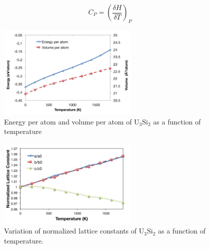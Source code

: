 \documentclass[review]{elsarticle}
\begin{document}
\begin{equation}
\label{eq:cp}
C_{P} = \left(\frac{\delta H}{\delta T}\right)_{P}
\end{equation}

 \begin{figure}[hbt]
	\centering
	\includegraphics[width=0.6\textwidth]{u3si2tempA.png}
    \caption{Energy per atom and volume per atom of U$_{3}$Si$_{2}$ as a function of temperature}\label{fig:ben5}
\end{figure}

\begin{figure}[hbt]
	\centering
	\includegraphics[width=0.6\textwidth]{latticetemp.jpg}
    \caption{Variation of normalized lattice constants of U$_{3}$Si$_{2}$ as a function of temperature.}\label{fig:latticetemp}
\end{figure}

\FloatBarrier
\end{document}
